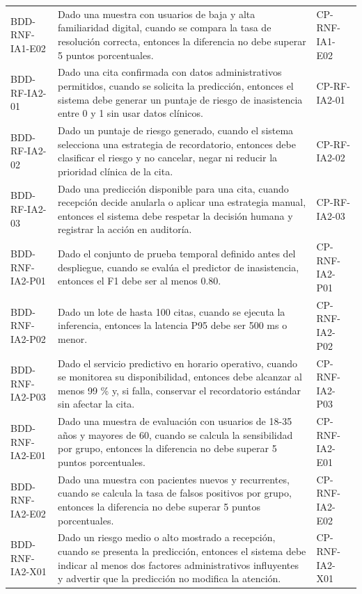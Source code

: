 \documentclass[11pt,a4paper]{article}
\begin{document}
\begin{appendices}
\begin{longtable}{p{2.8cm}p{10.6cm}p{2cm}}
			BDD-RNF-IA1-E02 & Dado una muestra con usuarios de baja y alta familiaridad digital, cuando se compara la tasa de resolución correcta, entonces la diferencia no debe superar 5 puntos porcentuales. & CP-RNF-IA1-E02\\
			BDD-RF-IA2-01 & Dado una cita confirmada con datos administrativos permitidos, cuando se solicita la predicción, entonces el sistema debe generar un puntaje de riesgo de inasistencia entre 0 y 1 sin usar datos clínicos. & CP-RF-IA2-01\\
			BDD-RF-IA2-02 & Dado un puntaje de riesgo generado, cuando el sistema selecciona una estrategia de recordatorio, entonces debe clasificar el riesgo y no cancelar, negar ni reducir la prioridad clínica de la cita. & CP-RF-IA2-02\\
			BDD-RF-IA2-03 & Dado una predicción disponible para una cita, cuando recepción decide anularla o aplicar una estrategia manual, entonces el sistema debe respetar la decisión humana y registrar la acción en auditoría. & CP-RF-IA2-03\\
			BDD-RNF-IA2-P01 & Dado el conjunto de prueba temporal definido antes del despliegue, cuando se evalúa el predictor de inasistencia, entonces el F1 debe ser al menos 0.80. & CP-RNF-IA2-P01\\
			BDD-RNF-IA2-P02 & Dado un lote de hasta 100 citas, cuando se ejecuta la inferencia, entonces la latencia P95 debe ser 500 ms o menor. & CP-RNF-IA2-P02\\
			BDD-RNF-IA2-P03 & Dado el servicio predictivo en horario operativo, cuando se monitorea su disponibilidad, entonces debe alcanzar al menos 99 \% y, si falla, conservar el recordatorio estándar sin afectar la cita. & CP-RNF-IA2-P03\\
			BDD-RNF-IA2-E01 & Dado una muestra de evaluación con usuarios de 18-35 años y mayores de 60, cuando se calcula la sensibilidad por grupo, entonces la diferencia no debe superar 5 puntos porcentuales. & CP-RNF-IA2-E01\\
			BDD-RNF-IA2-E02 & Dado una muestra con pacientes nuevos y recurrentes, cuando se calcula la tasa de falsos positivos por grupo, entonces la diferencia no debe superar 5 puntos porcentuales. & CP-RNF-IA2-E02\\
			BDD-RNF-IA2-X01 & Dado un riesgo medio o alto mostrado a recepción, cuando se presenta la predicción, entonces el sistema debe indicar al menos dos factores administrativos influyentes y advertir que la predicción no modifica la atención. & CP-RNF-IA2-X01\\
			\bottomrule\end{longtable}
				\normalsize
		

\end{appendices}
\end{document}
